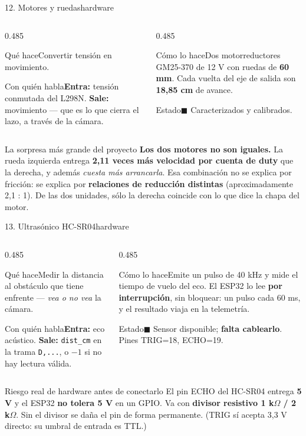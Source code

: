 \documentclass[aspectratio=169,10pt]{beamer}
\newcommand{\listo}{\textcolor{verde}{$\blacksquare$}}
\newcommand{\curso}{\textcolor{ambar}{$\blacksquare$}}
\newcommand{\ficha}[4]{%
  {\footnotesize
  \begin{columns}[T,onlytextwidth]
    \begin{column}{0.485\textwidth}
      \begin{block}{Qué hace}#1\end{block}
      \begin{block}{Con quién habla}#3\end{block}
    \end{column}
    \begin{column}{0.485\textwidth}
      \begin{block}{Cómo lo hace}#2\end{block}
      \begin{block}{Estado}#4\end{block}
    \end{column}
  \end{columns}}}
\begin{document}
\begin{frame}{12. Motores y ruedas\hfill{\small\mdseries hardware}}
  \ficha
  {Convertir tensión en movimiento.}
  {Dos motorreductores GM25-370 de 12 V con ruedas de \textbf{60 mm}. Cada
   vuelta del eje de salida son \textbf{18,85 cm} de avance.}
  {\textbf{Entra:} tensión conmutada del L298N. \textbf{Sale:} movimiento ---
   que es lo que cierra el lazo, a través de la cámara.}
  {\listo{} Caracterizados y calibrados.}

  \vspace{0.5em}
  \begin{alertblock}{La sorpresa más grande del proyecto}
    \small
    \textbf{Los dos motores no son iguales.} La rueda izquierda entrega
    \textbf{2,11 veces más velocidad por cuenta de duty} que la derecha, y
    además \emph{cuesta más arrancarla}. Esa combinación no se explica por
    fricción: se explica por \textbf{relaciones de reducción distintas}
    (aproximadamente 2,1 : 1). De las dos unidades, sólo la derecha coincide con
    lo que dice la chapa del motor.
  \end{alertblock}
\end{frame}

\begin{frame}{13. Ultrasónico HC-SR04\hfill{\small\mdseries hardware}}
  \ficha
  {Medir la distancia al obstáculo que tiene enfrente --- \emph{vea o no vea}
   la cámara.}
  {Emite un pulso de 40 kHz y mide el tiempo de vuelo del eco. El ESP32 lo lee
   \textbf{por interrupción}, sin bloquear: un pulso cada 60 ms, y el resultado
   viaja en la telemetría.}
  {\textbf{Entra:} eco acústico. \textbf{Sale:} \texttt{dist\_cm} en la trama
   \texttt{D,...}, o $-1$ si no hay lectura válida.}
  {\curso{} Sensor disponible; \textbf{falta cablearlo}. Pines TRIG=18, ECHO=19.}

  \vspace{0.3em}
  \small
  \begin{alertblock}{Riesgo real de hardware antes de conectarlo}
    El pin ECHO del HC-SR04 entrega \textbf{5 V} y el ESP32 \textbf{no tolera
    5 V} en un GPIO. Va con \textbf{divisor resistivo 1 k$\Omega$ / 2 k$\Omega$}.
    Sin el divisor se daña el pin de forma permanente. (TRIG sí acepta 3,3 V
    directo: su umbral de entrada es TTL.)
  \end{alertblock}
\end{frame}
\end{document}
